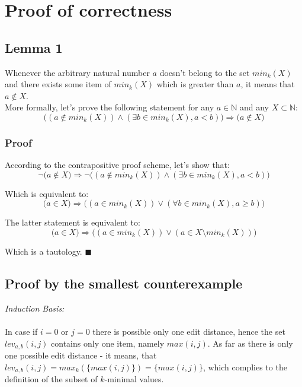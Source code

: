 \documentclass[fleqn,leqno]{article}
\begin{document}
\section*{Proof of correctness} 

\subsection*{Lemma 1}
Whenever the arbitrary natural number $a$ doesn't belong to the set $min_k(X)$ and there exists some item of $min_k(X)$ which is greater than $a$, it means that $a \not \in X$. \\

More formally, let's prove the following statement for any $a \in \mathbb{N}$ and any $X \subset \mathbb{N}$:
\begin{equation}
	\Big( (a \not \in min_k(X)) \wedge (\exists b \in min_k(X), a < b) \Big) \Rightarrow \Big( a \not \in X \Big)
\end{equation}

\subsubsection*{Proof}

According to the contrapositive  proof scheme, let's show that: 
\begin{equation}
	\neg \Big( a \not \in X \Big) \Rightarrow \neg \Big( (a \not \in min_k(X)) \wedge (\exists b \in min_k(X), a < b) \Big)
\end{equation}

Which is equivalent to:
\begin{equation}
	\Big( a \in X \Big) \Rightarrow \Big( (a \in min_k(X)) \lor (\forall b \in min_k(X), a \geq b) \Big)
\end{equation}

The latter statement is equivalent to:
\begin{equation}
	\Big( a \in X \Big) \Rightarrow \Big( (a \in min_k(X)) \lor (a \in X \setminus min_k(X)) \Big)
\end{equation}

Which is a tautology. $\blacksquare$

\subsection*{Proof by the smallest counterexample}

\textit{Induction Basis:} \\ \\
In case if $i = 0$ or $j = 0$ there is possible only one edit distance, hence the set $lev_{a,b}(i, j)$ contains only one item, namely $max(i, j)$. As far as there is only one possible edit distance - it means, that $lev_{a,b}(i, j) = max_k(\{ max(i, j) \}) = \{ max(i, j) \}$, which complies to the definition of the subset of $k$-minimal values. \\
\end{document}
